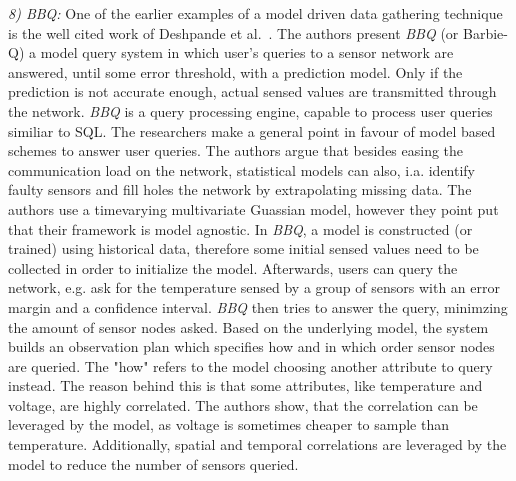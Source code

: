 \textit{8) BBQ:}
One of the earlier examples of a model driven data gathering technique is the
well cited work of Deshpande et al.~\cite{deshpande2004model}. The authors
present \textit{BBQ} (or Barbie-Q) a model query system in which user's queries
to a sensor network are answered, until some error threshold, with a prediction
model. Only if the prediction is not accurate enough, actual sensed values are
transmitted through the network. \textit{BBQ} is a query processing engine,
capable to process user queries similiar to \ac{SQL}. The researchers make a
general point in favour of model based schemes to answer user queries. The
authors argue that besides easing the communication load on the network,
statistical models can also, i.a. identify faulty sensors and fill holes the
network by extrapolating missing data. The authors use a timevarying
multivariate Guassian model, however they point put that their framework is
model agnostic. In \textit{BBQ}, a model is constructed (or trained) using
historical data, therefore some initial sensed values need to be collected in
order to initialize the model. Afterwards, users can query the network, e.g.
ask for the temperature sensed by a group of sensors with an error margin and a
confidence interval. \textit{BBQ} then tries to answer the query, minimzing the
amount of sensor nodes asked. Based on the underlying model, the system builds
an observation plan which specifies how and in which order sensor nodes are
queried. The "how" refers to the model choosing another attribute to query
instead. The reason behind this is that some attributes, like temperature and
voltage, are highly correlated. The authors show, that the correlation can be
leveraged by the model, as voltage is sometimes cheaper to sample than
temperature. Additionally, spatial and temporal correlations are leveraged by
the model to reduce the number of sensors queried.

